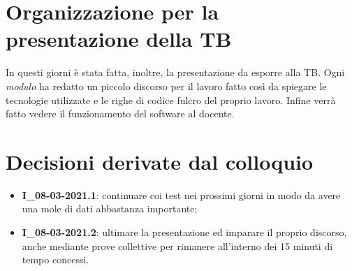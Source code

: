 \section{Organizzazione per la presentazione della TB}
In questi giorni è stata fatta, inoltre, la presentazione da esporre alla TB.
Ogni \textit{modulo} ha redatto un piccolo discorso per il lavoro fatto così da spiegare le tecnologie utilizzate e le righe di codice fulcro del proprio lavoro.
Infine verrà fatto vedere il funzionamento del software al docente.


\section{Decisioni derivate dal colloquio}
  \begin{itemize}
    \item \textbf{I\_08-03-2021.1}: continuare coi test nei prossimi giorni in modo da avere una mole di dati abbastanza importante;
    \item \textbf{I\_08-03-2021.2}: ultimare la presentazione ed imparare il proprio discorso, anche mediante prove collettive per rimanere all'interno dei 15 minuti di tempo concessi.
  \end{itemize}
